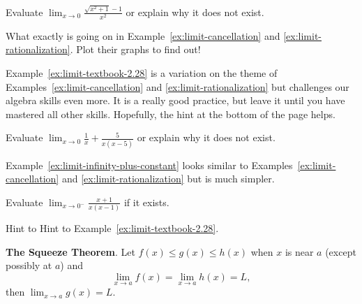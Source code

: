 \documentclass[../main.tex]{subfiles}
\begin{document}
  \begin{example} \label{ex:limit-rationalization}
    Evaluate \(\lim_{x \to 0} \frac{\sqrt{x^{2}+1}-1}{x^{2}}\) or explain why it does not exist.
  \end{example}

  \faComment{} What exactly is going on in Example~\ref{ex:limit-cancellation} and \ref{ex:limit-rationalization}. Plot their graphs to find out!
  \clearpage

  Example~\ref{ex:limit-textbook-2.28} is a variation on the theme of Examples~\ref{ex:limit-cancellation} and \ref{ex:limit-rationalization} but challenges our algebra skills even more. It is a really good practice, but leave it until you have mastered all other skills. Hopefully, the hint at the bottom of the page helps.
  \begin{example} \label{ex:limit-textbook-2.28}
    Evaluate \(\lim_{x \to 0} \frac{1}{x} + \frac{5}{x(x-5)}\) or explain why it does not exist.
  \end{example}

  Example~\ref{ex:limit-infinity-plus-constant} looks similar to Examples~\ref{ex:limit-cancellation} and \ref{ex:limit-rationalization} but is much simpler.
  \begin{example} \label{ex:limit-infinity-plus-constant}
    Evaluate \(\lim_{x \to 0^{-}} \frac{x+1}{x(x-1)}\) if it exists.
  \end{example}

  \vfill{}
  {\scriptsize Hint to Hint to Example~\ref{ex:limit-textbook-2.28}}. \newline
  \clearpage

  \begin{mdframed}[style=withref]
    \textbf{The Squeeze Theorem}. Let {\(f(x) \le g(x) \le h(x)\)} when \(x\) is near \(a\) (except possibly at \(a\)) and
    \[ { \lim_{x \to a} f(x) = \lim_{x \to a} h(x) = L,} \]
    then
    {\(\lim_{x \to a} g(x) = L\).}

  \end{mdframed}
\end{document}
